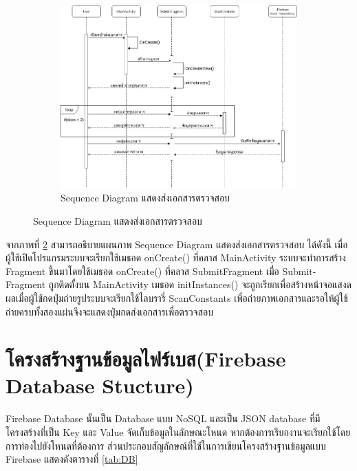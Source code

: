 	\begin{figure}
	\begin{figure}[H]
		\centering
		\includegraphics[width=0.8\columnwidth]
		{Figures/3/Sequence/submit}
		\caption{Sequence Diagram แสดงส่งเอกสารตรวจสอบ}
		\label{Fig:Sequence-submit}
	\end{figure}
	\end{figure}
	\newpage
	จากภาพที่ \ref{Fig:Sequence-submit} สามารถอธิบายแผนภาพ Sequence Diagram แสดงส่งเอกสารตรวจสอบ ได้ดังนี้ เมื่อผู้ใช้เปิดโปรแกรมระบบจะเรียกใช้เมธอด onCreate() ที่คลาส MainActivity ระบบจะทำการสร้าง
	Fragment ขึ้นมาโดยใช้เมธอด onCreate() ที่คลาส SubmitFragment เมื่อ Submit-Fragment ถูกติดตั้งบน MainActivity เมธอด initInstances() จะถูกเรียกเพื่อสร้างหน้าจอแสงดผลเมื่อผู้ใช้กดปุ่มถ่ายรูประบบจะเรียกใช้ไลบรารี่ ScanConstants เพื่อถ่ายภาพเอกสารและรอให้ผู้ใช้ถ่ายครบทั้งสองแผ่นจึงจะแสดงปุ่มกดส่งเอกสารเพื่อตรวจสอบ
\newpage	 
	
\section{โครงสร้างฐานข้อมูลไฟร์เบส(Firebase Database Stucture)}
Firebase Database นั้นเป็น Database แบบ NoSQL และเป็น JSON database ที่มีโครงสร้างที่เป็น Key และ Value จัดเก็บข้อมูลในลักษณะโหนด หากต้องการเรียกงานจะเรียกใช้โดย
การท่องไปยังโหนดที่ต้องการ ส่วนประกอบสัญลักษณ์ที่ใช้ในการเขียนโครงสร้างฐานข้อมูลแบบ Firebase
แสดงดังตารางที่ \ref{tab:DB}

